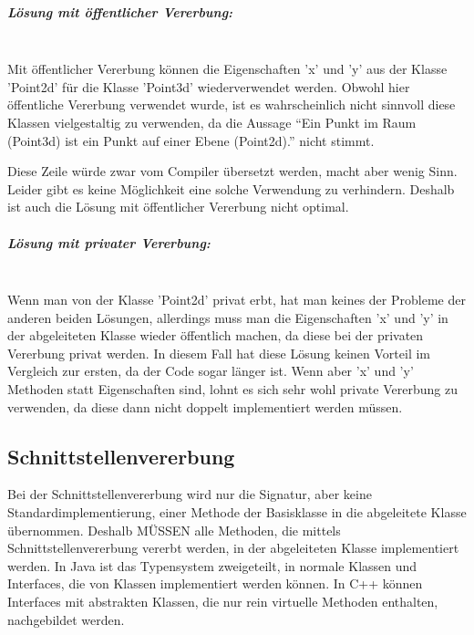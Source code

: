 		\subparagraph*{Lösung mit öffentlicher Vererbung:}\mbox{}\\
		Mit öffentlicher Vererbung können die Eigenschaften 'x' und 'y' aus der Klasse 'Point2d' für die Klasse 'Point3d'
		wiederverwendet werden.
		\UseRawInputEncoding{}
		Obwohl hier öffentliche Vererbung verwendet wurde, ist es wahrscheinlich nicht sinnvoll diese Klassen vielgestaltig
		zu verwenden, da die Aussage ``Ein Punkt im Raum (Point3d) ist ein Punkt auf einer Ebene (Point2d).'' nicht stimmt.
		
		\UseRawInputEncoding{}
		Diese Zeile würde zwar vom Compiler übersetzt werden, macht aber wenig Sinn. Leider gibt es keine Möglichkeit eine
		solche Verwendung zu verhindern. Deshalb ist auch die Lösung mit öffentlicher Vererbung nicht optimal.
		
		\subparagraph*{Lösung mit privater Vererbung:}\mbox{}\\
		\UseRawInputEncoding{}
		Wenn man von der Klasse 'Point2d' privat erbt, hat man keines der Probleme der anderen beiden Lösungen,
		allerdings muss man die Eigenschaften 'x' und 'y' in der abgeleiteten Klasse wieder öffentlich machen, da diese bei
		der privaten Vererbung privat werden. In diesem Fall hat diese Lösung keinen Vorteil im Vergleich zur ersten, da
		der Code sogar länger ist. Wenn aber 'x' und 'y' Methoden statt Eigenschaften sind, lohnt es sich sehr wohl private
		Vererbung zu verwenden, da diese dann nicht doppelt implementiert werden müssen.
	
	\subsection{Schnittstellenvererbung}
		Bei der Schnittstellenvererbung wird nur die Signatur, aber keine Standardimplementierung, einer Methode der
		Basisklasse	in die abgeleitete Klasse übernommen. Deshalb MÜSSEN alle Methoden, die mittels Schnittstellenvererbung
		vererbt werden, in der abgeleiteten Klasse implementiert werden. In Java ist das Typensystem zweigeteilt, in normale
		Klassen und Interfaces, die von Klassen implementiert werden können. In C++ können Interfaces mit abstrakten Klassen,
		die nur rein virtuelle Methoden enthalten, nachgebildet werden.
		
